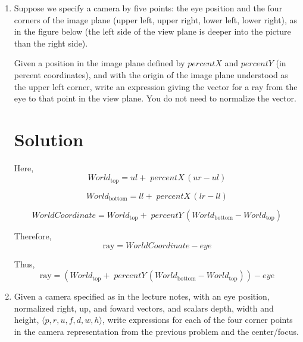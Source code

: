 \documentclass{article}
\begin{document}
\begin{enumerate}
  \newpage
  
\item Suppose we specify a camera by five points: the eye position and the four corners of
  the image plane (upper left, upper right, lower left, lower right),
  as in the figure below (the left side of the view plane is deeper
  into the picture than the right side). 

    \tikzset{>=latex}

Given a position in the image plane defined by $percentX$ and $percentY$ (in percent coordinates), 
and with the origin of the image plane understood
as the upper left corner, write an expression giving the vector for a
ray from the eye to that point in the view plane. You do not need to
normalize the vector.

\section*{Solution}

Here, 
\[
World_{\text{top}} = ul + \; percentX \,(ur - ul)
\]

\[
World_{\text{bottom}} = ll + \; percentX \,(lr - ll)
\]

\[
WorldCoordinate = World_{\text{top}} + \; percentY \,(World_{\text{bottom}} - World_{\text{top}})
\]

\medskip

Therefore, 
\[
\text{ray} = WorldCoordinate - eye
\]

Thus, 
\[
\boxed{\text{ray} = (World_{\text{top}} + \; percentY \,(World_{\text{bottom}} - World_{\text{top}})) - eye}
\]

\newpage

\item Given a camera specified as in the lecture notes, with an eye
  position, normalized right, up, and foward vectors, and scalars depth,
  width and height, $\langle p, r, u, f, d, w, h\rangle$, write
  expressions for each of the four corner points in the camera representation
  from the previous problem and the center/focus.

\end{enumerate}
\end{document}
